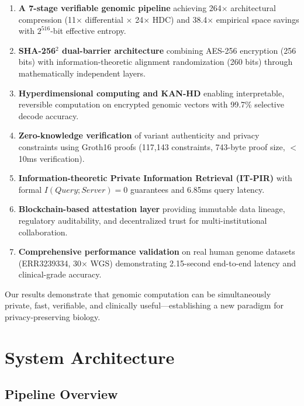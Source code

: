 \documentclass[12pt,a4paper]{article}
\begin{document}
\begin{enumerate}
\item \textbf{A 7-stage verifiable genomic pipeline} achieving 264$\times$ architectural compression (11$\times$ differential $\times$ 24$\times$ HDC) and 38.4$\times$ empirical space savings with $2^{516}$-bit effective entropy.

\item \textbf{SHA-256$^2$ dual-barrier architecture} combining AES-256 encryption (256 bits) with information-theoretic alignment randomization (260 bits) through mathematically independent layers.

\item \textbf{Hyperdimensional computing and KAN-HD} enabling interpretable, reversible computation on encrypted genomic vectors with 99.7\% selective decode accuracy.

\item \textbf{Zero-knowledge verification} of variant authenticity and privacy constraints using Groth16 proofs (117,143 constraints, 743-byte proof size, $<$10ms verification).

\item \textbf{Information-theoretic Private Information Retrieval (IT-PIR)} with formal $I(Query; Server) = 0$ guarantees and 6.85ms query latency.

\item \textbf{Blockchain-based attestation layer} providing immutable data lineage, regulatory auditability, and decentralized trust for multi-institutional collaboration.

\item \textbf{Comprehensive performance validation} on real human genome datasets (ERR3239334, 30$\times$ WGS) demonstrating 2.15-second end-to-end latency and clinical-grade accuracy.
\end{enumerate}

Our results demonstrate that genomic computation can be simultaneously private, fast, verifiable, and clinically useful---establishing a new paradigm for privacy-preserving biology.

\section{System Architecture}

\subsection{Pipeline Overview}
\end{document}
